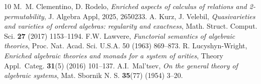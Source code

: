 \documentclass[11pt]{amsart}
\theoremstyle{plain}
\theoremstyle{definition}
\theoremstyle{remark}
\begin{document}
\begin{thebibliography}{10}
 M.~M. Clementino, D. Rodelo, \emph{Enriched aspects of calculus of relations and 2-permutability}, J. Algebra Appl, 2025, 2650233.
 A. Kurz, J. Velebil, \emph{Quasivarieties and varieties of ordered algebras: regularity and exactness}, Math. Struct. Comput. Sci. \textbf{27} (2017) 1153--1194.
 F.W. Lawvere, \emph{Functorial semantics of algebraic theories}, Proc. Nat. Acad.
Sci. U.S.A. 50 (1963) 869--873.
 R. Lucyshyn-Wright, \emph{Enriched algebraic theories and monads for a system of arities}, Theory Appl.~Categ. \textbf{31}(5) (2016) 101--137.
 A.I.~Mal'tsev, \emph{On the general theory of algebraic systems}, Mat. Sbornik N. S. \textbf{35}(77) (1954) 3--20.

\end{thebibliography}
\end{document}
